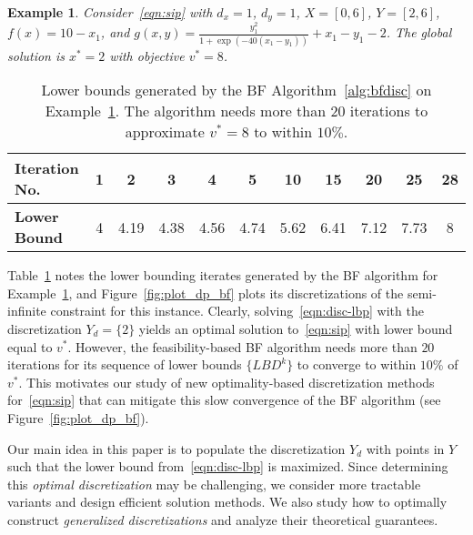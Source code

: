 \documentclass{article}
\newcommand{\1}[1]{\mathds{1}\left[#1\right]}
\newtheorem{example}{Example}
\begin{document}
\begin{example}{\citep[Ex.\ (DP)]{mitsos2009test}}
\label{exm:dp}
Consider~\eqref{eqn:sip} with $d_x = 1$, $d_y = 1$, $X = [0,6]$, $Y = [2,6]$, $f(x) = 10 - x_1$, and $g(x,y) = \frac{y^2_1}{1 + \exp(-40(x_1-y_1))} + x_1 - y_1 - 2$.
The global solution is $x^* = 2$ with objective $v^* = 8$.
\end{example}


\begin{table}[t]
\centering
\begin{tabular}{l|c|c|c|c|c|c|c|c|c|c}
\hline
\textbf{Iteration No.} & 1 & 2    & 3    & 4    & 5    & 10   & 15   & 20   & 25   & 28 \\ \hline
\textbf{Lower Bound}     & 4 & 4.19 & 4.38 & 4.56 & 4.74 & 5.62 & 6.41 & 7.12 & 7.73 & 8  \\ \hline
\end{tabular}
\caption{Lower bounds generated by the BF Algorithm~\ref{alg:bfdisc} on Example~\ref{exm:dp}. The algorithm needs more than $20$ iterations to approximate $v^* = 8$ to within $10\%$.}
\label{tab:exdp}
\end{table}


Table~\ref{tab:exdp} notes the lower bounding iterates generated by the BF algorithm for Example~\ref{exm:dp}, and Figure~\ref{fig:plot_dp_bf} plots its discretizations of the semi-infinite constraint for this instance.
Clearly, solving~\eqref{eqn:disc-lbp} with the discretization $Y_d = \{2\}$ yields an optimal solution to~\eqref{eqn:sip} with lower bound equal to $v^*$.
However, the feasibility-based BF algorithm needs more than $20$ iterations for its sequence of lower bounds $\{LBD^k\}$ to converge to within $10\%$ of $v^*$.
This motivates our study of new optimality-based discretization methods for~\eqref{eqn:sip} that can mitigate this slow convergence of the BF algorithm (see Figure~\ref{fig:plot_dp_bf}).

Our main idea in this paper is to populate the discretization $Y_d$ with points in $Y$ such that the lower bound from~\eqref{eqn:disc-lbp} is maximized.
Since determining this \textit{optimal discretization} may be challenging, we consider more tractable variants and design efficient solution methods.
We also study how to optimally construct \textit{generalized discretizations} and analyze their theoretical guarantees.
\end{document}
